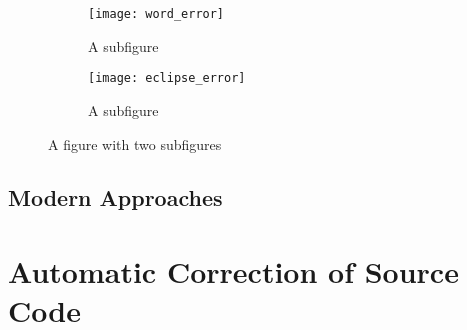 \begin{figure}
\centering
\begin{subfigure}{.5\textwidth}
  \centering
  \texttt{[image: word\_error]}
  \caption{A subfigure}
  \label{fig:sub1}
\end{subfigure}%
\begin{subfigure}{.5\textwidth}
  \centering
  \texttt{[image: eclipse\_error]}
  \caption{A subfigure}
  \label{fig:sub2}
\end{subfigure}
\caption{A figure with two subfigures}
\label{fig:test}
\end{figure}

\subsection{Modern Approaches}


\section{Automatic Correction of Source Code}
